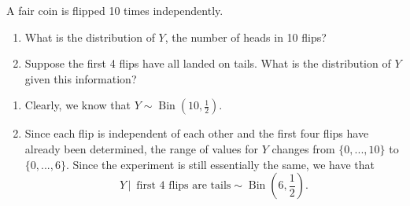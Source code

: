 \documentclass[notoc,notitlepage]{tufte-book}
\DeclareMathOperator{\Bin}{Bin }
\begin{document}
\begin{eg}\label{eg:basic_conditional_probability}
  A fair coin is flipped 10 times independently.
  \begin{enumerate}
    \item What is the distribution of $Y$, the number of heads in 10 flips?
    \item Suppose the first 4 flips have all landed on tails. What is the distribution of $Y$ given this information?
  \end{enumerate}

  \begin{solution}
    \begin{enumerate}
      \item Clearly, we know that $Y \sim \Bin \left(10, \frac{1}{2}\right)$.
      \item Since each flip is independent of each other and the first four flips have already been determined, the range of values for $Y$ changes from $\{0,...,10\}$ to $\{0, ..., 6\}$. Since the experiment is still essentially the same, we have that
      \begin{equation*}
        Y \, | \, \text{ first 4 flips are tails} \sim \Bin \left( 6, \frac{1}{2} \right).
      \end{equation*}
    \end{enumerate}
  \end{solution}
\end{eg}
\end{document}
